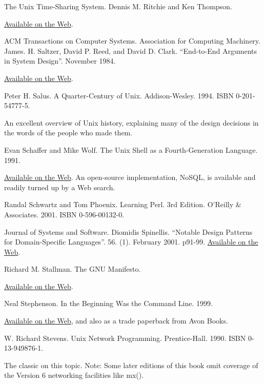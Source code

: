 \documentclass[12pt,oneside]{book}
\begin{document}
\begin{common-format}
\begin{thebibliography}{9}
 The Unix Time-Sharing System. Dennis M. Ritchie and Ken Thompson.

\href{http://cm.bell-labs.com/cm/cs/who/dmr/cacm.html}{Available on the Web}.

 ACM Transactions on Computer Systems. Association for Computing Machinery. James. H. Saltzer, David P. Reed, and David D. Clark. “End-to-End Arguments in System Design”. November 1984.

\href{http://web.mit.edu/Saltzer/www/publications/endtoend/endtoend.pdf}{Available on the Web}.

 Peter H. Salus. A Quarter-Century of Unix. Addison-Wesley. 1994. ISBN 0-201-54777-5.

An excellent overview of Unix history, explaining many of the design decisions in the words of the people who made them.

 Evan Schaffer and Mike Wolf. The Unix Shell as a Fourth-Generation Language. 1991.

\href{http://www.rdb.com/lib/4gl.pdf}{Available on the Web}. An open-source implementation, NoSQL, is available and readily turned up by a Web search.

 Randal Schwartz and Tom Phoenix. Learning Perl. 3rd Edition. O'Reilly \&{} Associates. 2001. ISBN 0-596-00132-0.

 Journal of Systems and Software. Diomidis Spinellis. “Notable Design Patterns for Domain-Specific Languages”. 56. (1). February 2001. p91-99. \href{http://www.catb.org/~esr/writings/taoup/html/apb.html}{Available on the Web}.

 Richard M. Stallman. The GNU Manifesto.

\href{http://www.gnu.org/gnu/manifesto.html}{Available on the Web}.

 Neal Stephenson. In the Beginning Was the Command Line. 1999.

\href{http://www.cryptonomicon.com/beginning.html}{Available on the Web}, and also as a trade paperback from Avon Books.

 W. Richard Stevens. Unix Network Programming. Prentice-Hall. 1990. ISBN 0-13-949876-1.

The classic on this topic. Note: Some later editions of this book omit coverage of the Version 6 networking facilities like mx().


\end{thebibliography}
\end{common-format}
\end{document}
